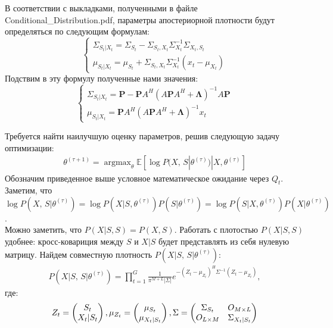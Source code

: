 \documentclass[11pt]{article}
\newcommand{\Expect}{\mathbb{E}}
\DeclareMathOperator*{\argmax}{argmax}
\begin{document}
В соответствии с выкладками, полученными в файле  Conditional\_Distribution.pdf, параметры апостериорной плотности будут определяться по следующим формулам:
\begin{equation}
\left\{ \begin{gathered} 
\Sigma_{S_t|X_t} = \Sigma_{S_t}-\Sigma_{S_t,X_t}\Sigma_{X_t}^{-1}\Sigma_{X_t,S_t} \\
\mu_{S_t|X_t} = \mu_{S_t} + \Sigma_{S_t,X_t}\Sigma_{X_t}^{-1}(x_t-\mu_{X_t})
\end{gathered} \right.
\end{equation}
Подствим в эту формулу полученные нами значения:
\begin{equation}
\left\{ \begin{gathered} 
\Sigma_{S_t|X_t} = \mathbf{P}-\mathbf{P}A^H(A\mathbf{P}A^H+\mathbf{\Lambda})^{-1}A\mathbf{P} \\
\mu_{S_t|X_t} = \mathbf{P}A^H(A\mathbf{P}A^H+\mathbf{\Lambda})^{-1} x_t
\end{gathered} \right.
\end{equation}
\begin{center}
\fontsize{16}{20}\selectfont {}
\end{center}
Требуется найти наилучшую оценку параметров, решив следующую задачу оптимизации:
\begin{gather}
\theta^{(\tau+1)}=\argmax_{\theta} \Expect[\log P(X, \, S|\theta^{(\tau)})|X, \theta^{(\tau)}]
\end{gather}
Обозначим приведенное выше условное математическое ожидание через $Q_t$. 
Заметим, что \\ $\log P(X, \, S|\theta^{(\tau)}) = \log P(X|S,\theta^{(\tau)})P(S|\theta^{(\tau)}) = \log P(S|X,\theta^{(\tau)})P(X|\theta^{(\tau)})$.\\
Можно заметить, что $P(X|S, S) = P(X, S)$. Работать с плотостью $P(X|S, S)$ удобнее: кросс-ковариция между $S$ и $X|S$ будет представлять из себя нулевую матрицу.
Найдем совместную плотность $P(X|S, \, S|\theta^{(\tau)})$:
\begin{gather}
P(X|S, \, S|\theta^{(\tau)}) = \prod_{t=1}^G \frac{1}{\pi^{M+L}|\Sigma|}e^{-(Z_t-\mu_{Z_t})^H\Sigma^{-1}(Z_t-\mu_{Z_t})},
\end{gather}
где:
\begin{equation*}
Z_t = \begin{pmatrix}
S_t\\
X_t|S_t
\end{pmatrix},
\mu_{Z_t} = \begin{pmatrix}
\mu_{S_t}\\
\mu_{X_t|S_t}
\end{pmatrix}\\,
\Sigma = 
\begin{pmatrix}
\Sigma_{S_t}&O_{M\times L}\\
O_{L\times M}&\Sigma_{X_t|S_t}
\end{pmatrix}
\end{equation*}
\end{document}
